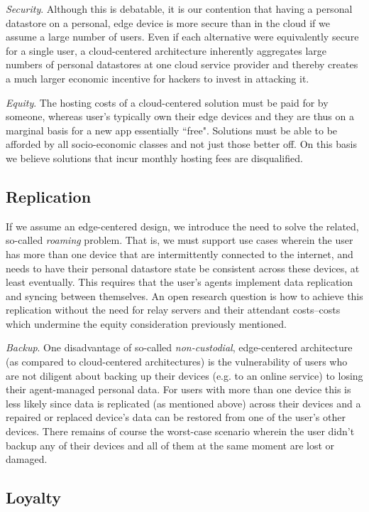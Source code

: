 \documentclass[11pt, oneside]{article}   	%
\begin{document}
\emph{Security}. Although this is debatable, it is our contention that having a personal datastore on a personal, edge device is more secure than in the cloud if we assume a large number of users. Even if each  alternative were equivalently secure for a single user, a cloud-centered architecture inherently aggregates large numbers of personal datastores at one cloud service provider and thereby creates a much larger economic incentive for hackers to invest in attacking it. 

\emph{Equity}. The hosting costs of a cloud-centered solution must be paid for by someone, whereas user's typically own their edge devices and they are thus on a marginal basis for a new app essentially ``free". Solutions must be able to be afforded by all socio-economic classes and not just those better off. On this basis we believe solutions that incur monthly hosting fees are disqualified.

\subsection{Replication}

If we assume an edge-centered design, we introduce the need to solve the related, so-called \emph{roaming} problem. That is, we must support use cases wherein the user has more than one device that are intermittently connected to the internet, and needs to have their personal datastore state be consistent across these devices, at least eventually. This requires that the user's agents implement data replication and syncing between themselves. An open research question is how to achieve this replication without the need for relay servers and their attendant costs--costs which undermine the equity consideration previously mentioned.

\emph{Backup}. One disadvantage of so-called \emph{non-custodial}, edge-centered architecture (as compared to cloud-centered architectures) is the vulnerability of users who are not diligent about backing up their devices (e.g. to an online service) to losing their agent-managed personal data. For users with more than one device this is less likely since data is replicated (as mentioned above) across their devices and a repaired or replaced device's data can be restored from one of the user's other devices. There remains of course the worst-case scenario wherein the user didn't backup any of their devices and all of them at the same moment are lost or damaged. 

\subsection{Loyalty}
\end{document}
